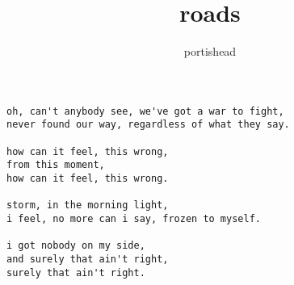 \author{portishead}
\title{roads}
\maketitle
\begin{verbatim}
oh, can't anybody see, we've got a war to fight,
never found our way, regardless of what they say.

how can it feel, this wrong,
from this moment,
how can it feel, this wrong.

storm, in the morning light,
i feel, no more can i say, frozen to myself.

i got nobody on my side,
and surely that ain't right,
surely that ain't right.
\end{verbatim}